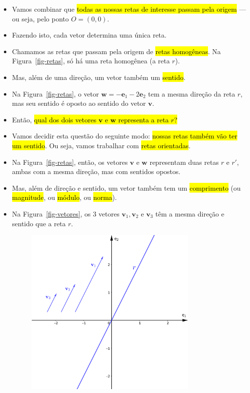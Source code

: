 \documentclass[
  letterpaper,
  DIV=11,
  numbers=noendperiod]{scrreprt}
\begin{document}
\begin{itemize}
\begin{figure}[t]
  \end{figure}
\item
  Vamos combinar que {\hl{todas as nossas retas de interesse passam pela
  origem}} --- ou seja, pelo ponto $O=(0,0)$.
\item
  Fazendo isto, cada vetor determina uma única reta.
\item
  Chamamos as retas que passam pela origem de {\hl{retas homogêneas}}.
  Na Figura~\ref{fig-retas}, só há uma reta homogênea (a reta $r$).
\item
  Mas, além de uma direção, um vetor também um {\hl{sentido}}.
\item
  Na Figura~\ref{fig-retas}, o vetor
  $\mathbf{w} = -\mathbf{e}_{1} - 2\mathbf{e}_{2}$ tem a mesma direção
  da reta $r$, mas seu sentido é oposto ao sentido do vetor
  $\mathbf{v}$.
\item
  Então, {\hl{qual dos dois vetores $\mathbf{v}$ e $\mathbf{w}$
  representa a reta $r$?}}
\item
  Vamos decidir esta questão do seguinte modo: {\hl{nossas retas também
  vão ter um sentido}}. Ou seja, vamos trabalhar com {\hl{retas
  orientadas}}.
\item
  Na Figura~\ref{fig-retas}, então, os vetores $\mathbf{v}$ e
  $\mathbf{w}$ representam duas retas $r$ e $r'$, ambas com a mesma
  direção, mas com sentidos opostos.
\item
  Mas, além de direção e sentido, um vetor também tem um
  {\hl{comprimento}} (ou {\hl{magnitude}}, ou {\hl{módulo}}, ou
  {\hl{norma}}).
\item
  Na Figura~\ref{fig-vetores}, os $3$ vetores
  $\mathbf{v}_1, \mathbf{v}_2$ e $\mathbf{v}_3$ têm a mesma direção e
  sentido que a reta $r$.

  \begin{figure}[t]

  {\centering \includegraphics[width=0.8\textwidth,height=\textheight]{figures/reta-vetores.png}

}
\end{figure}
\end{itemize}
\end{document}
